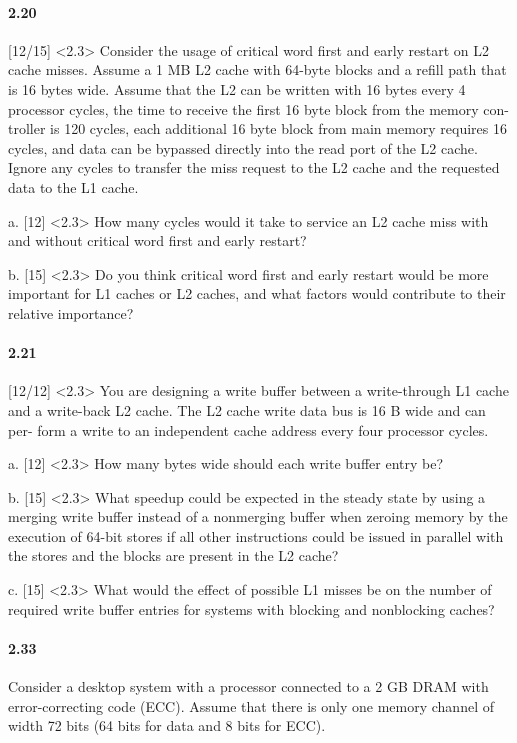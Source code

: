 \documentclass{article}
\begin{document}
\paragraph{2.20} [12/15] <2.3> Consider the usage of critical word first and early restart on L2 cache misses. Assume a 1 MB L2 cache with 64-byte blocks and a refill path that is 16 bytes wide. Assume that the L2 can be written with 16 bytes every 4 processor cycles, the time to receive the first 16 byte block from the memory con- troller is 120 cycles, each additional 16 byte block from main memory requires 16 cycles, and data can be bypassed directly into the read port of the L2 cache. Ignore any cycles to transfer the miss request to the L2 cache and the requested data to the L1 cache.

a. [12] <2.3> How many cycles would it take to service an L2 cache miss with and without critical word first and early restart?

b. [15] <2.3> Do you think critical word first and early restart would be more important for L1 caches or L2 caches, and what factors would contribute to their relative importance?

\paragraph{2.21} [12/12] <2.3> You are designing a write buffer between a write-through L1 cache and a write-back L2 cache. The L2 cache write data bus is 16 B wide and can per- form a write to an independent cache address every four processor cycles.

a. [12] <2.3> How many bytes wide should each write buffer entry be?

b. [15] <2.3> What speedup could be expected in the steady state by using a merging write buffer instead of a nonmerging buffer when zeroing memory by the execution of 64-bit stores if all other instructions could be issued in parallel with the stores and the blocks are present in the L2 cache?

c. [15] <2.3> What would the effect of possible L1 misses be on the number of required write buffer entries for systems with blocking and nonblocking caches?

\paragraph{2.33} Consider a desktop system with a processor connected to a 2 GB DRAM with error-correcting code (ECC). Assume that there is only one memory channel of width 72 bits (64 bits for data and 8 bits for ECC).
\end{document}

